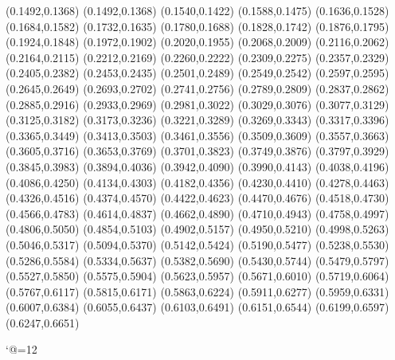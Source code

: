 \PST@Solid(0.1492,0.1368)
(0.1492,0.1368)
(0.1540,0.1422)
(0.1588,0.1475)
(0.1636,0.1528)
(0.1684,0.1582)
(0.1732,0.1635)
(0.1780,0.1688)
(0.1828,0.1742)
(0.1876,0.1795)
(0.1924,0.1848)
(0.1972,0.1902)
(0.2020,0.1955)
(0.2068,0.2009)
(0.2116,0.2062)
(0.2164,0.2115)
(0.2212,0.2169)
(0.2260,0.2222)
(0.2309,0.2275)
(0.2357,0.2329)
(0.2405,0.2382)
(0.2453,0.2435)
(0.2501,0.2489)
(0.2549,0.2542)
(0.2597,0.2595)
(0.2645,0.2649)
(0.2693,0.2702)
(0.2741,0.2756)
(0.2789,0.2809)
(0.2837,0.2862)
(0.2885,0.2916)
(0.2933,0.2969)
(0.2981,0.3022)
(0.3029,0.3076)
(0.3077,0.3129)
(0.3125,0.3182)
(0.3173,0.3236)
(0.3221,0.3289)
(0.3269,0.3343)
(0.3317,0.3396)
(0.3365,0.3449)
(0.3413,0.3503)
(0.3461,0.3556)
(0.3509,0.3609)
(0.3557,0.3663)
(0.3605,0.3716)
(0.3653,0.3769)
(0.3701,0.3823)
(0.3749,0.3876)
(0.3797,0.3929)
(0.3845,0.3983)
(0.3894,0.4036)
(0.3942,0.4090)
(0.3990,0.4143)
(0.4038,0.4196)
(0.4086,0.4250)
(0.4134,0.4303)
(0.4182,0.4356)
(0.4230,0.4410)
(0.4278,0.4463)
(0.4326,0.4516)
(0.4374,0.4570)
(0.4422,0.4623)
(0.4470,0.4676)
(0.4518,0.4730)
(0.4566,0.4783)
(0.4614,0.4837)
(0.4662,0.4890)
(0.4710,0.4943)
(0.4758,0.4997)
(0.4806,0.5050)
(0.4854,0.5103)
(0.4902,0.5157)
(0.4950,0.5210)
(0.4998,0.5263)
(0.5046,0.5317)
(0.5094,0.5370)
(0.5142,0.5424)
(0.5190,0.5477)
(0.5238,0.5530)
(0.5286,0.5584)
(0.5334,0.5637)
(0.5382,0.5690)
(0.5430,0.5744)
(0.5479,0.5797)
(0.5527,0.5850)
(0.5575,0.5904)
(0.5623,0.5957)
(0.5671,0.6010)
(0.5719,0.6064)
(0.5767,0.6117)
(0.5815,0.6171)
(0.5863,0.6224)
(0.5911,0.6277)
(0.5959,0.6331)
(0.6007,0.6384)
(0.6055,0.6437)
(0.6103,0.6491)
(0.6151,0.6544)
(0.6199,0.6597)
(0.6247,0.6651)

\catcode`@=12
\fi
\endpspicture
